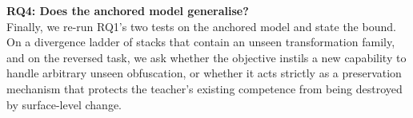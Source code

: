 \vspace{0.5em}
\noindent
\textbf{RQ4: Does the anchored model generalise?} \\
Finally, we re-run RQ1's two tests on the anchored model and state the bound. On a divergence
ladder of stacks that contain an unseen transformation family, and on the reversed task, we ask
whether the objective instils a new capability to handle arbitrary unseen obfuscation, or whether
it acts strictly as a preservation mechanism that protects the teacher's existing competence from
being destroyed by surface-level change.
